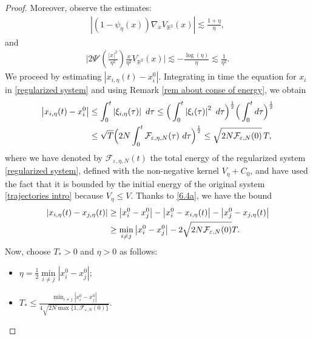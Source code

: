 \documentclass[10pt,a4paper]{amsart}
\def\dd{{\rm d}}
\begin{document}
\begin{proof}
Moreover, observe the estimates: 
\begin{align}
\left\vert (1-\psi_{\eta}(x))\nabla_{x} V_{\mathbb{R}^{2}}(x)\right\vert\lesssim \frac{1+\eta}{\eta}, \label{estimate for cutoff}       
\end{align}
and 
\begin{align}
\Big\vert 2\Psi'(\frac{\left\vert x\right\vert^{2}}{\eta^{2}})\frac{x}{\eta^{2}}V_{\mathbb{R}^{2}}(x)\Big\vert
\lesssim -\frac{\log(\eta)}{\eta}\lesssim \frac{1}{\eta^{2}}. \label{est for cutoff 2}      
\end{align}
We proceed by estimating $\left|x_{i,\eta}(t)-x_{i}^{0}\right|$. Integrating in time the equation for $x_{i}$ in \eqref{regularized system} and using Remark \ref{rem about conse of energy},
we obtain 
\begin{align}
\left\vert x_{i,\eta}(t)-x_{i}^{0}\right\vert 
&\leq \int_{0}^{t}\left\vert \xi_{i,\eta}(\tau)\right\vert\ \dd \tau  
\leq \Big(\int_{0}^{t}\left\vert \xi_{i}(\tau)\right\vert^{2}\ \dd\tau\Big)^{\frac{1}{2}}
\Big(\int_{0}^{t} \dd \tau\Big)^{\frac{1}{2}}\notag\\
&\leq \sqrt{T}\Big(2N\int_{0}^{t}\mathcal{F}_{\varepsilon,\eta,N}(\tau)\ \dd \tau\Big)^{\frac{1}{2}}
\leq \sqrt{2N\mathcal{F}_{\varepsilon,N}(0)}\,T, \label{6.4a}    
\end{align}
where we have denoted by $\mathcal{F}_{\varepsilon,\eta,N}(t)$ 
the total energy of the regularized system \eqref{regularized system}, defined with the non-negative kernel $V_\eta+C_0$,
and have used the fact that it is bounded by the initial energy of the original 
system \eqref{trajectories intro} because $V_{\eta}\leq V$. 
Thanks to \eqref{6.4a},
we have the bound 
\begin{align}
\left\vert x_{i,\eta}(t)-x_{j,\eta}(t)\right\vert&\geq \left\vert x_{i}^{0}-x_{j}^{0}\right\vert-\left\vert x_{i}^{0}-x_{i,\eta}(t)\right\vert-\left\vert x_{j}^{0}-x_{j,\eta}(t)\right\vert \notag\\
&\geq \underset{i\neq j}{\min}\left\vert x_{i}^{0}-x_{j}^{0}\right\vert-2\sqrt{2N\mathcal{F}_{\varepsilon,N}(0)}T.  \label{bound on distance from below}\end{align}
Now,  choose $T_{\ast}>0$ and $\eta>0$ as follows:  
\begin{itemize}
\item[{\rm(a)}]$\eta=\frac{1}{2}\underset{i\neq j}{\min}\left\vert x_{i}^{0}-x_{j}^{0}\right\vert;$
\item[{\rm(b)}] $T_{\ast}\leq \frac{\min_{i\neq j}\left\vert x_{i}^{0}-x_{j}^{0}\right\vert }{4\sqrt{2N\max\{1,\mathcal{F}_{\varepsilon,N}(0)\}}}.$  

\end{itemize}
\end{proof}
\end{document}
